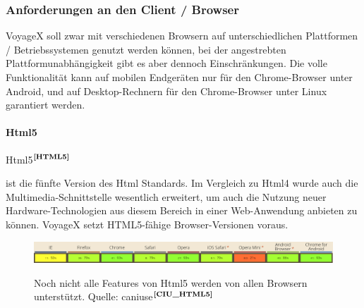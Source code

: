 \subsubsection{Anforderungen an den Client / Browser}\label{4_ACB}
VoyageX soll zwar mit verschiedenen Browsern auf unterschiedlichen Plattformen / Betriebssystemen genutzt werden können, bei der angestrebten Plattformunabhängigkeit gibt es aber dennoch Einschränkungen. Die volle Funktionalität kann auf mobilen Endgeräten nur für den Chrome-Browser unter Android, und auf Desktop-Rechnern für den Chrome-Browser unter Linux garantiert werden.

\paragraph{Html5}
Html5$^{\textbf{\ref{HTML5}}}$%
\addtocounter{footnote}{1}%
ist die fünfte Version des Html Standards. Im Vergleich zu Html4 wurde auch die Multimedia-Schnittstelle wesentlich erweitert, um auch die Nutzung neuer Hardware-Technologien aus diesem Bereich in einer Web-Anwendung anbieten zu können. VoyageX setzt HTML5-fähige Browser-Versionen voraus. 
  \begin{figure}[H]
  \begin{adjustwidth}{-1.5cm}{1.5cm}
      \centering
	  \includegraphics[scale=0.6]{bilder/screenshots/caniuse_html5.png}\\ 
  	  \caption{Noch nicht alle Features von Html5 werden von allen Browsern unterstützt.
  	  Quelle: caniuse$^{\textbf{\ref{CIU_HTML5}}}$}
  \end{adjustwidth}
  \end{figure}
\addtocounter{footnote}{1}%

